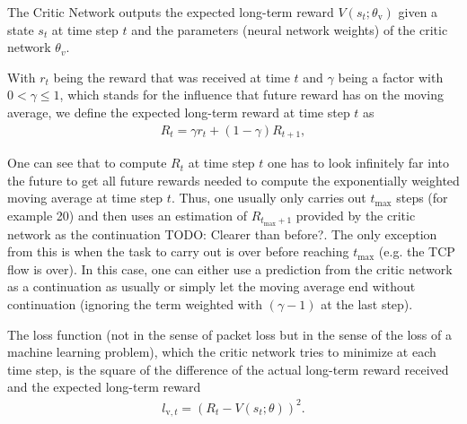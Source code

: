\documentclass[sigconf]{acmart}
\newcommand\note[2]{{\color{#1}#2}}
\newcommand\todo[1]{{\note{red}{TODO: #1}}}
\begin{document}
The Critic Network outputs the expected long-term reward $V(s_{t}; \theta_\text{v})$ given a state $s_t$ at time step $t$ and the parameters (neural network weights) of the critic network $\theta_v$.

With $r_t$ being the reward that was received at time $t$ and $\gamma$ being a factor with $0 < \gamma \leq 1$, which stands for the influence that future reward has on the moving average, we define the expected long-term reward at time step $t$ as 
\begin{align*}
R_t = \gamma r_{t} + (1-\gamma) R_{t+1} ,
\end{align*}

One can see that to compute $R_t$ at time step $t$ one has to look infinitely far into the future to get all future rewards needed to compute the exponentially weighted moving average at time step $t$. Thus, one usually only carries out $t_\text{max}$ steps (for example 20) and then uses an estimation of $R_{t_\text{max}+1}$ provided by the critic network as the continuation \todo{Clearer than before?}. The only exception from this is when the task to carry out is over before reaching $t_\text{max}$ (e.g. the TCP flow is over). In this case, one can either use a prediction from the critic network as a continuation as usually or simply let the moving average end without continuation (ignoring the term weighted with $(\gamma-1)$ at the last step). 



The loss function (not in the sense of packet loss but in the sense of the loss of a machine learning problem), which the critic network tries to minimize at each time step, is the square of the difference of the actual long-term reward received and the expected long-term reward
\begin{align*}
l_{\text{v},t} = \left(R_t - V(s_t; \theta)\right)^2.
\end{align*}
\end{document}

